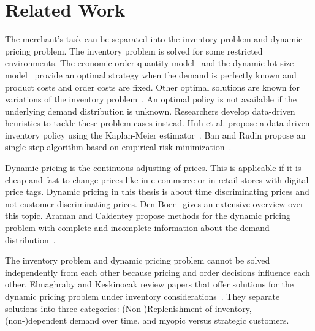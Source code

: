 
\chapter{Related Work}

The merchant's task can be separated into the inventory problem and dynamic pricing problem.
The inventory problem is solved for some restricted environments.
The economic order quantity model~\cite{harris1913many} and the dynamic lot size model~\cite{wagner1958dynamic} provide an optimal strategy when the demand is perfectly known and product costs and order costs are fixed.
Other optimal solutions are known for variations of the inventory problem~\cite{scarf1963survey, arrow1958studies}.
An optimal policy is not available if the underlying demand distribution is unknown.
Researchers develop data-driven heuristics to tackle these problem cases instead.
Huh et al. propose a data-driven inventory policy using the Kaplan-Meier estimator~\cite{huh2011adaptive}.
Ban and Rudin propose an single-step algorithm based on empirical risk minimization~\cite{ban2017big}.

Dynamic pricing is the continuous adjusting of prices.
This is applicable if it is cheap and fast to change prices like in e-commerce or in retail stores with digital price tags. %
Dynamic pricing in this thesis is about time discriminating prices and not customer discriminating prices. %
Den Boer~\cite{den2015dynamic} gives an extensive overview over this topic.
Araman and Caldentey propose methods for the dynamic pricing problem with complete and incomplete information about the demand distribution~\cite{araman2011revenue}.


The inventory problem and dynamic pricing problem cannot be solved independently from each other because pricing and order decisions influence each other.
Elmaghraby and Keskinocak review papers that offer solutions for the dynamic pricing problem under inventory considerations~\cite{elmaghraby2003dynamic}.
They separate solutions into three categories:
(Non-)Replenishment of inventory, (non-)dependent demand over time, and myopic versus strategic customers.

